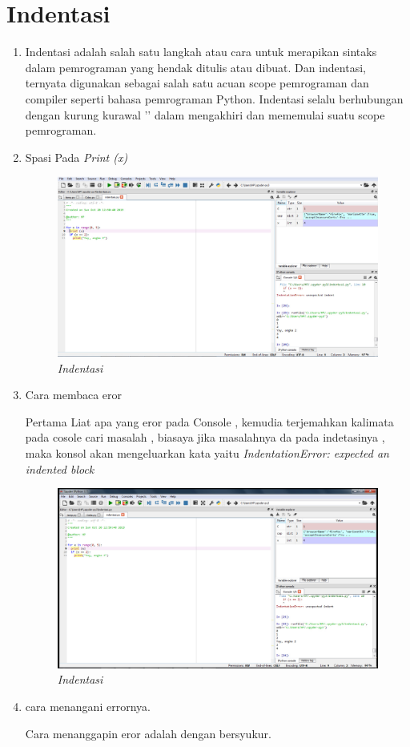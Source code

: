 \section{Indentasi}
\begin{enumerate}
	\item Indentasi adalah salah satu langkah atau cara untuk merapikan sintaks dalam pemrograman yang hendak ditulis atau dibuat. Dan indentasi, ternyata digunakan sebagai salah satu acuan scope pemrograman dan compiler seperti bahasa pemrograman Python. Indentasi selalu berhubungan dengan kurung kurawal '{}' dalam mengakhiri dan mememulai suatu scope pemrograman.
	\item Spasi Pada \textit{Print (x)}
	\begin{figure}[!htbp]
    \centering
    \includegraphics[scale=0.2]{figures/30.PNG}
    \caption{\textit{Indentasi}}
    \label{Figurepython}
    \end{figure}
\item Cara membaca eror
\par
Pertama Liat apa yang eror pada Console , kemudia terjemahkan kalimata pada cosole cari masalah , biasaya jika masalahnya da pada indetasinya , maka konsol akan mengeluarkan kata yaitu \textit{IndentationError: expected an indented block}
	\begin{figure}[!htbp]
    \centering
    \includegraphics[scale=0.2]{figures/31.PNG}
    \caption{\textit{Indentasi}}
    \label{Figurepython}
    \end{figure}
\item cara menangani errornya.
\par
Cara menanggapin eror adalah dengan bersyukur.
\end{enumerate}
